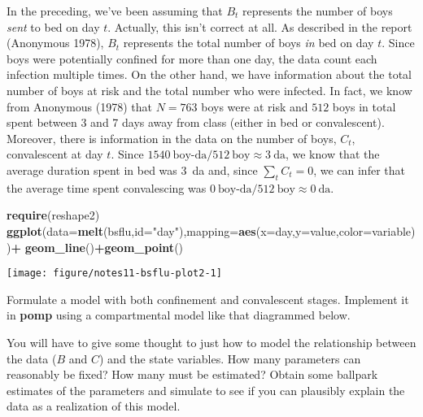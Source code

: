\documentclass[]{article}
\newenvironment{Shaded}{\begin{snugshade}}{\end{snugshade}}
\newcommand{\KeywordTok}[1]{\textcolor[rgb]{0.13,0.29,0.53}{\textbf{#1}}}
\newcommand{\DataTypeTok}[1]{\textcolor[rgb]{0.13,0.29,0.53}{#1}}
\newcommand{\StringTok}[1]{\textcolor[rgb]{0.31,0.60,0.02}{#1}}
\newcommand{\OperatorTok}[1]{\textcolor[rgb]{0.81,0.36,0.00}{\textbf{#1}}}
\newcommand{\NormalTok}[1]{#1}
\begin{document}
In the preceding, we've been assuming that \(B_t\) represents the number
of boys \emph{sent} to bed on day \(t\). Actually, this isn't correct at
all. As described in the report (Anonymous 1978), \(B_t\) represents the
total number of boys \emph{in} bed on day \(t\). Since boys were
potentially confined for more than one day, the data count each
infection multiple times. On the other hand, we have information about
the total number of boys at risk and the total number who were infected.
In fact, we know from Anonymous (1978) that \(N=763\) boys were at risk
and \(512\) boys in total spent between 3 and 7 days away from class
(either in bed or convalescent). Moreover, there is information in the
data on the number of boys, \(C_t\), convalescent at day \(t\). Since
\(1540~\text{boy-da}/512~\text{boy} \approx 3~\text{da}\), we know that
the average duration spent in bed was 3~da and, since \(\sum_t\!C_t=0\),
we can infer that the average time spent convalescing was
\(0~\text{boy-da}/512~\text{boy} \approx 0~\text{da}\).

\begin{Shaded}
\begin{Highlighting}[]
\KeywordTok{require}\NormalTok{(reshape2)}
\KeywordTok{ggplot}\NormalTok{(}\DataTypeTok{data=}\KeywordTok{melt}\NormalTok{(bsflu,}\DataTypeTok{id=}\StringTok{"day"}\NormalTok{),}\DataTypeTok{mapping=}\KeywordTok{aes}\NormalTok{(}\DataTypeTok{x=}\NormalTok{day,}\DataTypeTok{y=}\NormalTok{value,}\DataTypeTok{color=}\NormalTok{variable))}\OperatorTok{+}
\StringTok{  }\KeywordTok{geom_line}\NormalTok{()}\OperatorTok{+}\KeywordTok{geom_point}\NormalTok{()}
\end{Highlighting}
\end{Shaded}

\begin{center}\texttt{[image: figure/notes11-bsflu-plot2-1]} \end{center}

Formulate a model with both confinement and convalescent stages.
Implement it in \textbf{pomp} using a compartmental model like that
diagrammed below.

\hypertarget{htmlwidget-fcce0d5c6205a6196b75}{}

You will have to give some thought to just how to model the relationship
between the data (\(B\) and \(C\)) and the state variables. How many
parameters can reasonably be fixed? How many must be estimated? Obtain
some ballpark estimates of the parameters and simulate to see if you can
plausibly explain the data as a realization of this model.
\end{document}
